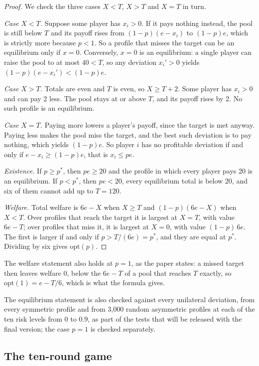 \documentclass[10pt]{article}
\let\plainsubsection\subsection
\renewcommand{\subsection}{\FloatBarrier\needspace{8\baselineskip}\plainsubsection}
\newcommand{\popt}{p^{*}}
\begin{document}
\begin{proof}
We check the three cases $X<T$, $X>T$ and $X=T$ in turn.

\emph{Case $X<T$.} Suppose some player has $x_i>0$. If it pays nothing instead, the pool is still below $T$ and its payoff rises from $(1-p)(e-x_i)$ to $(1-p)e$, which is strictly more because $p<1$. So a profile that misses the target can be an equilibrium only if $x=0$. Conversely, $x=0$ is an equilibrium: a single player can raise the pool to at most $40<T$, so any deviation $x_i'>0$ yields $(1-p)(e-x_i')<(1-p)e$.

\emph{Case $X>T$.} Totals are even and $T$ is even, so $X\ge T+2$. Some player has $x_i>0$ and can pay 2 less. The pool stays at or above $T$, and its payoff rises by 2. No such profile is an equilibrium.

\emph{Case $X=T$.} Paying more lowers a player's payoff, since the target is met anyway. Paying less makes the pool miss the target, and the best such deviation is to pay nothing, which yields $(1-p)e$. So player $i$ has no profitable deviation if and only if $e-x_i\ge(1-p)e$, that is $x_i\le pe$.

\emph{Existence.} If $p\ge\popt$, then $pe\ge20$ and the profile in which every player pays 20 is an equilibrium. If $p<\popt$, then $pe<20$, every equilibrium total is below 20, and six of them cannot add up to $T=120$.

\emph{Welfare.} Total welfare is $6e-X$ when $X\ge T$ and $(1-p)(6e-X)$ when $X<T$. Over profiles that reach the target it is largest at $X=T$, with value $6e-T$; over profiles that miss it, it is largest at $X=0$, with value $(1-p)\,6e$. The first is larger if and only if $p>T/(6e)=\popt$, and they are equal at $\popt$. Dividing by six gives $\mathrm{opt}(p)$.
\end{proof}

The welfare statement also holds at $p=1$, as the paper states: a missed target then leaves welfare 0, below the $6e-T$ of a pool that reaches $T$ exactly, so $\mathrm{opt}(1)=e-T/6$, which is what the formula gives.

The equilibrium statement is also checked against every unilateral deviation, from every symmetric profile and from 3,000 random asymmetric profiles at each of the ten risk levels from 0 to 0.9, as part of the tests that will be released with the final version; the case $p=1$ is checked separately.

\subsection{The ten-round game}
\end{document}
